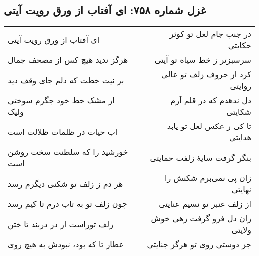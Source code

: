 \begin{center}
\section*{غزل شماره ۷۵۸: ای آفتاب از ورق رویت آیتی}
\label{sec:758}
\begin{longtable}{l p{0.5cm} r}
ای آفتاب از ورق رویت آیتی
&&
در جنب جام لعل تو کوثر حکایتی
\\
هرگز ندید هیچ کس از مصحف جمال
&&
سرسبزتر ز خط سیاه تو آیتی
\\
بر نیت خطت که دلم جای وقف دید
&&
کرد از حروف زلف تو عالی روایتی
\\
از مشک خط خود جگرم سوختی ولیک
&&
دل ندهدم که در قلم آرم شکایتی
\\
آب حیات در ظلمات ظلالت است
&&
تا کی ز عکس لعل تو یابد هدایتی
\\
خورشید را که سلطنت سخت روشن است
&&
بنگر گرفت سایهٔ زلفت حمایتی
\\
هر دم ز زلف تو شکنی دیگرم رسد
&&
زان پی نمی‌برم شکنش را نهایتی
\\
چون زلف تو به تاب درم تا کیم رسد
&&
از زلف عنبر تو نسیم عنایتی
\\
زلف توراست از در دربند تا ختن
&&
زان دل فرو گرفت زهی خوش ولایتی
\\
عطار تا که بود، نبودش به هیچ روی
&&
جز دوستی روی تو هرگز جنایتی
\\
\end{longtable}
\end{center}
